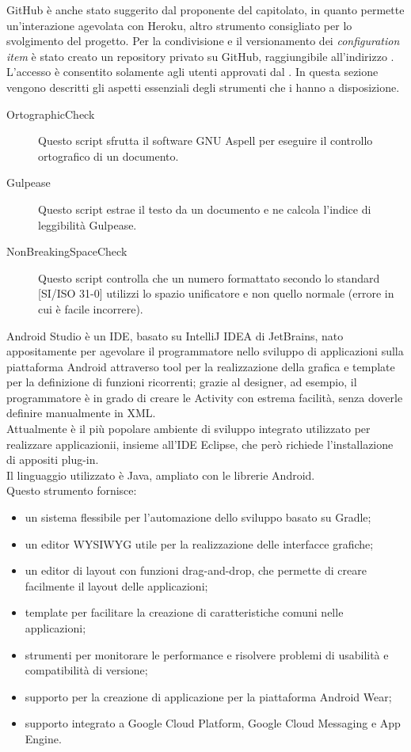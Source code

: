 		GitHub è anche stato suggerito dal proponente del capitolato, in quanto permette un'interazione agevolata con Heroku, altro strumento consigliato per lo svolgimento del progetto. 
			Per la condivisione e il versionamento dei \textit{configuration item} è stato creato un repository privato su GitHub, raggiungibile all’indirizzo . L’accesso è consentito solamente agli utenti approvati dal .
		In questa sezione vengono descritti gli aspetti essenziali degli strumenti che i  hanno a disposizione.
		\begin{description}
			\item[OrtographicCheck] Questo script sfrutta il software GNU Aspell per eseguire il controllo ortografico di un documento.
			\item[Gulpease] Questo script estrae il testo da un documento e ne calcola l'indice di leggibilità Gulpease.
			\item[NonBreakingSpaceCheck] Questo script controlla che un numero formattato secondo lo standard [SI/ISO 31-0] utilizzi lo spazio unificatore e non quello normale (errore in cui è facile incorrere).
		\end{description}
		Android Studio è un IDE, basato su IntelliJ IDEA di JetBrains, nato appositamente per agevolare il programmatore nello sviluppo di applicazioni sulla piattaforma Android attraverso tool per la realizzazione della grafica e template per la definizione di funzioni ricorrenti; grazie al designer, ad esempio, il programmatore è in grado di creare le Activity con estrema facilità,  senza doverle definire manualmente in XML.\\
		Attualmente è il più popolare ambiente di sviluppo integrato utilizzato per realizzare applicazionii, insieme all'IDE Eclipse, che però richiede l'installazione di appositi plug-in.\\ 
		Il linguaggio utilizzato è Java, ampliato con le librerie Android.\\
		Questo strumento fornisce:
		\begin{itemize}
			\item un sistema flessibile per l'automazione dello sviluppo basato su Gradle;
			\item un editor WYSIWYG utile per la realizzazione delle interfacce grafiche;
			\item un editor di layout con funzioni drag-and-drop, che permette di creare facilmente il layout delle applicazioni;
			\item template per facilitare la creazione di caratteristiche comuni nelle applicazioni;
			\item strumenti per monitorare le performance e risolvere problemi di usabilità e compatibilità di versione;
			\item supporto per la creazione di applicazione per la piattaforma Android Wear;
			\item supporto integrato a Google Cloud Platform, Google Cloud Messaging e App Engine.
		\end{itemize}
